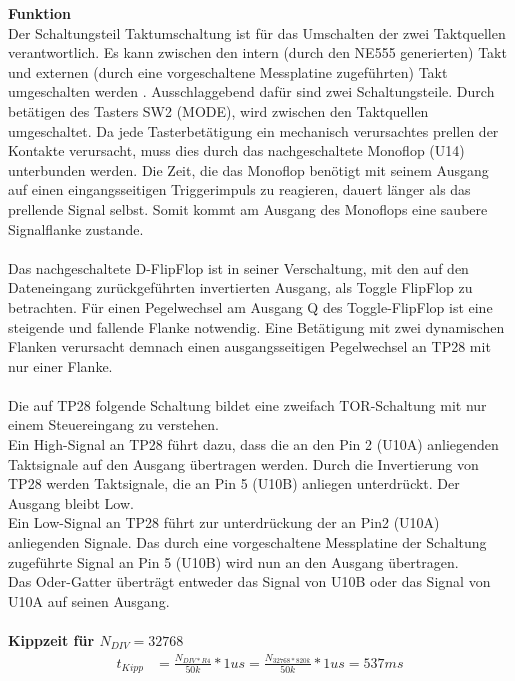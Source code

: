\textbf{Funktion}
\\
Der Schaltungsteil \glqq Taktumschaltung \grqq{} ist für das Umschalten der zwei Taktquellen verantwortlich. Es kann zwischen den intern (durch den NE555 generierten) Takt und externen (durch eine vorgeschaltene Messplatine zugeführten) Takt umgeschalten werden . Ausschlaggebend dafür sind zwei Schaltungsteile. Durch betätigen des Tasters SW2 (MODE), wird zwischen den Taktquellen umgeschaltet. Da jede Tasterbetätigung ein mechanisch verursachtes prellen der Kontakte verursacht, muss dies durch das nachgeschaltete  Monoflop (U14) unterbunden werden. Die Zeit, die das Monoflop benötigt mit seinem Ausgang auf einen eingangsseitigen Triggerimpuls zu reagieren, dauert länger als das prellende Signal selbst. Somit kommt am Ausgang des Monoflops eine saubere Signalflanke zustande. 
\\
\\
Das nachgeschaltete D-FlipFlop ist in seiner Verschaltung, mit den auf den Dateneingang zurückgeführten invertierten Ausgang, als Toggle FlipFlop zu betrachten. Für einen Pegelwechsel am Ausgang Q des Toggle-FlipFlop ist eine steigende und fallende Flanke notwendig. Eine Betätigung mit zwei dynamischen Flanken verursacht demnach einen ausgangsseitigen Pegelwechsel an TP28 mit nur einer Flanke. 
\\
\\
Die auf TP28 folgende Schaltung bildet eine zweifach TOR-Schaltung mit nur einem Steuereingang zu verstehen.
\\
Ein High-Signal an TP28 führt dazu, dass die an den Pin 2 (U10A) anliegenden Taktsignale auf den Ausgang übertragen werden. Durch die Invertierung von TP28 werden Taktsignale, die an Pin 5 (U10B) anliegen unterdrückt. Der Ausgang bleibt Low.
\\
Ein Low-Signal an TP28 führt zur unterdrückung der an Pin2 (U10A) anliegenden Signale. Das durch eine vorgeschaltene Messplatine der Schaltung zugeführte Signal an Pin 5 (U10B) wird nun an den Ausgang übertragen.
\\
Das Oder-Gatter überträgt entweder das Signal von U10B oder das Signal von U10A auf seinen Ausgang. 
\\
\\
\textbf{Kippzeit für $N_{DIV} = 32 768$}
\\
\begin{align}
	t_{Kipp} &= \frac{N_{DIV * R4}}{50k} * 1us = \frac{N_{32768 * 820k}}{50k} * 1us = 537ms
\end{align}


